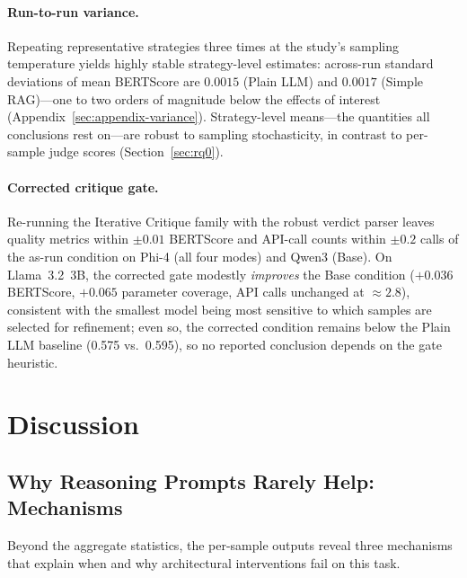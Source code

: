 \documentclass[pdflatex,sn-mathphys-ay]{sn-jnl}%
\theoremstyle{thmstyleone}%
\theoremstyle{thmstyletwo}%
\theoremstyle{thmstylethree}%
\begin{document}
\paragraph{Run-to-run variance.} Repeating representative strategies three times at the study's sampling temperature yields highly stable strategy-level estimates: across-run standard deviations of mean BERTScore are $0.0015$ (Plain LLM) and $0.0017$ (Simple RAG)---one to two orders of magnitude below the effects of interest (Appendix~\ref{sec:appendix-variance}). Strategy-level means---the quantities all conclusions rest on---are robust to sampling stochasticity, in contrast to per-sample judge scores (Section~\ref{sec:rq0}).
\paragraph{Corrected critique gate.} Re-running the Iterative Critique family with the robust verdict parser leaves quality metrics within $\pm 0.01$ BERTScore and API-call counts within $\pm 0.2$ calls of the as-run condition on Phi-4 (all four modes) and Qwen3 (Base). On Llama~3.2~3B, the corrected gate modestly \emph{improves} the Base condition ($+0.036$ BERTScore, $+0.065$ parameter coverage, API calls unchanged at ${\approx}2.8$), consistent with the smallest model being most sensitive to which samples are selected for refinement; even so, the corrected condition remains below the Plain LLM baseline (0.575 vs.\ 0.595), so no reported conclusion depends on the gate heuristic.


\section{Discussion}
\label{sec:discussion}

\subsection{Why Reasoning Prompts Rarely Help: Mechanisms}
\label{sec:mechanisms}
Beyond the aggregate statistics, the per-sample outputs reveal three mechanisms that explain when and why architectural interventions fail on this task.
\end{document}
